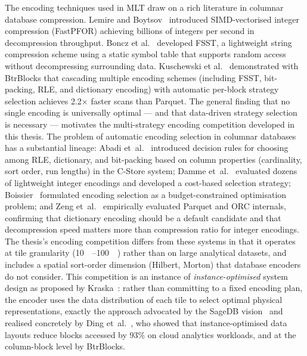 The encoding techniques used in MLT draw on a rich literature in columnar database compression.
Lemire and Boytsov~\cite{lemireDecodingBillionsIntegers2015} introduced \ac{SIMD}-vectorised integer compression (\ac{FastPFOR}) achieving billions of integers per second in decompression throughput.
Boncz et al.~\cite{bonczFSSTFastRandom2020} developed \ac{FSST}, a lightweight string compression scheme using a static symbol table that supports random access without decompressing surrounding data.
Kuschewski et al.~\cite{kuschewskiBtrBlocksEfficientColumnar2023} demonstrated with BtrBlocks that cascading multiple encoding schemes (including \ac{FSST}, bit-packing, \ac{RLE}, and dictionary encoding) with automatic per-block strategy selection achieves 2.2$\times$ faster scans than Parquet.
The general finding that no single encoding is universally optimal --- and that data-driven strategy selection is necessary --- motivates the multi-strategy encoding competition developed in this thesis.
The problem of automatic encoding selection in columnar databases has a substantial lineage: Abadi et~al.~\cite{abadiIntegratingCompressionExecution2006} introduced decision rules for choosing among RLE, dictionary, and bit-packing based on column properties (cardinality, sort order, run lengths) in the C-Store system; Damme et~al.~\cite{dammeComprehensiveExperimentalSurvey2019} evaluated dozens of lightweight integer encodings and developed a cost-based selection strategy; Boissier~\cite{boissierRobustBudgetConstrained2022} formulated encoding selection as a budget-constrained optimisation problem; and Zeng et~al.~\cite{zengEmpiricalEvaluationColumnar2024} empirically evaluated Parquet and ORC internals, confirming that dictionary encoding should be a default candidate and that decompression speed matters more than compression ratio for integer encodings.
The thesis's encoding competition differs from these systems in that it operates at tile granularity (\qtyrange{10}{100}{\kilo\byte}) rather than on large analytical datasets, and includes a spatial sort-order dimension (Hilbert, Morton) that database encoders do not consider.
This competition is an instance of \emph{instance-optimised} system design as proposed by Kraska~\cite{kraskaInstanceOptimizedData2021}: rather than committing to a fixed encoding plan, the encoder uses the data distribution of each tile to select optimal physical representations, exactly the approach advocated by the SageDB vision~\cite{kraskaSageDBLearnedDatabase2019} and realised concretely by Ding et~al.~\cite{dingInstanceOptimizedDataLayouts2021}, who showed that instance-optimised data layouts reduce blocks accessed by 93\% on cloud analytics workloads, and at the column-block level by BtrBlocks.
